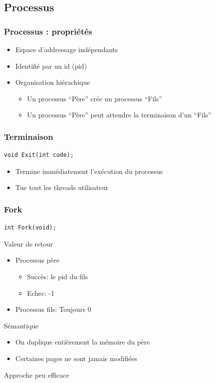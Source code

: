 \documentclass{beamer}
\begin{document}
\subsection{Processus}
\begin{frame}
  \frametitle{Processus : propriétés}
  \begin{itemize}
  \item Espace d'addressage indépendants
  \item Identifié par un id (pid)
  \item Organisation hiérachique
    \begin{itemize}
    \item Un processus ``Père'' crée un processus ``Fils''
    \item Un processus ``Père'' peut attendre la terminaison d'un ``Fils''
    \end{itemize}
  \end{itemize}
\end{frame}

\begin{frame}[fragile]
  \frametitle{Terminaison}
\begin{verbatim}
void Exit(int code);
\end{verbatim}
  \begin{itemize}
  \item Termine immédiatement l'exécution du processus
    \item Tue tout les threads utilisateur
  \end{itemize}
\end{frame}

\begin{frame}[fragile]
  \frametitle{Fork}
\begin{verbatim}
int Fork(void);
\end{verbatim}
Valeur de retour
\begin{itemize}
\item Processus père
  \begin{itemize}
  \item Succès: le pid du fils
  \item Echec: -1
  \end{itemize}
\item Processus fils: Toujours 0
\end{itemize}

Sémantique
\begin{itemize}
\item On duplique entièrement la mémoire du père
\item Certaines pages ne sont jamais modifiées
\end{itemize}
Approche peu efficace
\end{frame}
\end{document}
